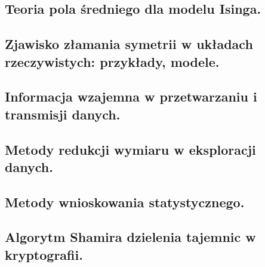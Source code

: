 \documentclass[10pt,a4paper]{article} %
\begin{document}
	\subsection{Teoria pola średniego dla modelu Isinga.}
	
	
	\subsection{Zjawisko złamania symetrii w układach rzeczywistych: przykłady, modele.}
	
	
	\subsection{Informacja wzajemna w przetwarzaniu i transmisji danych.}
	
	
	\subsection{Metody redukcji wymiaru w eksploracji danych.}
	
	
	\subsection{Metody wnioskowania statystycznego.}
	
	
	\subsection{Algorytm Shamira dzielenia tajemnic w kryptografii.}
	
	
\end{document}

